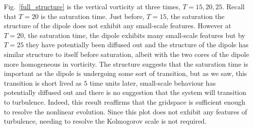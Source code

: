 Fig.~\ref{full_structure} is the vertical vorticity at three times, $T=15,20,25$. Recall that $T=20$ is the saturation time. Just before, $T=15$, the saturation the structure of the dipole does not exhibit any small-scale features. However at $T=20$, the saturation time, the dipole exhibits many small-scale features but by $T=25$ they have potentially been diffused out and the structure of the dipole has similar structure to itself before saturation, albeit with the two cores of the dipole more homogeneous in vorticity. The structure suggests that the saturation time is important as the dipole is undergoing some sort of transition, but as we saw, this transition is short lived as $5$ time units later, small-scale behaviour has potentially diffused out and there is no suggestion that the system will transition to turbulence. Indeed, this result reaffirms that the gridspace is sufficient enough to resolve the nonlinear evolution. Since this plot does not exhibit any features of turbulence, needing to resolve the Kolmogorov scale is not required. 
